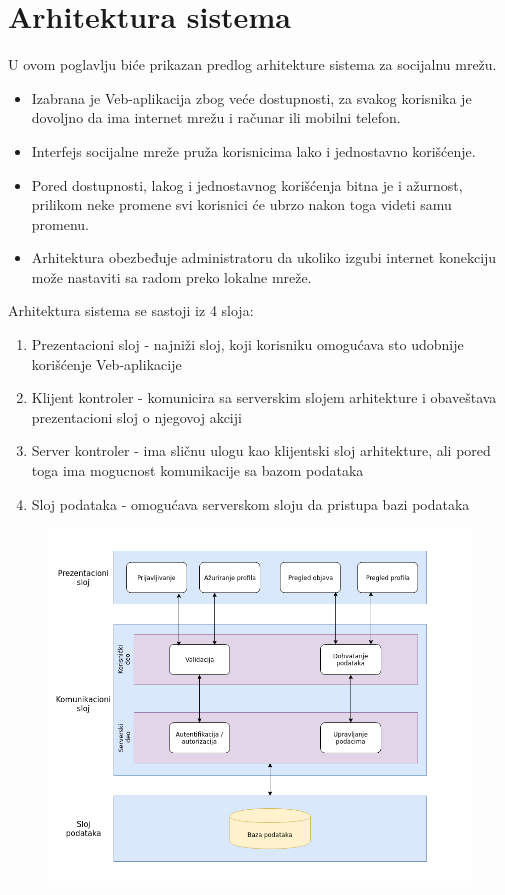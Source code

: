 \section{Arhitektura sistema}
U ovom poglavlju biće prikazan predlog arhitekture sistema za socijalnu mrežu. 
\begin{itemize}
    \item Izabrana je Veb-aplikacija zbog veće dostupnosti, za svakog korisnika je dovoljno da ima internet mrežu i računar ili mobilni telefon. 
    \item Interfejs socijalne mreže pruža korisnicima lako i jednostavno korišćenje.
    \item Pored dostupnosti, lakog i jednostavnog korišćenja bitna je i ažurnost, prilikom neke promene svi korisnici će ubrzo nakon toga videti samu promenu. 
    \item Arhitektura obezbeđuje administratoru da ukoliko izgubi internet konekciju može nastaviti sa radom preko lokalne mreže.
\end{itemize}
Arhitektura sistema se sastoji iz 4 sloja:
\begin{enumerate}
    \item Prezentacioni sloj - najniži sloj, koji korisniku omogućava sto udobnije korišćenje Veb-aplikacije
    \item Klijent kontroler - komunicira sa serverskim slojem arhitekture i obaveštava prezentacioni sloj o njegovoj akciji
    \item Server kontroler - ima sličnu ulogu kao klijentski sloj arhitekture, ali pored toga ima mogucnost komunikacije sa bazom podataka
    \item Sloj podataka - omogućava serverskom sloju da pristupa bazi podataka
\end{enumerate}
\begin{figure}[h!]
		\centerline{\includegraphics[width=\textwidth]{slike/arhitektura.png}}
\end{figure}
